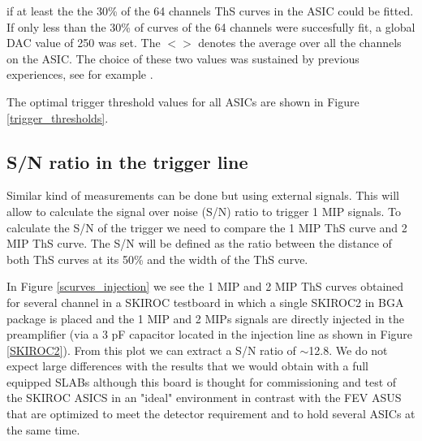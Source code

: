 \documentclass[a4paper,11pt]{article}
\begin{document}
if at least the the 30\% of the 64 channels ThS curves in the ASIC could be fitted.
If only less  than the 30\% of curves of the 64 channels were
succesfully fit, a global DAC value of 250 was set.
The $<>$ denotes the average over all the channels on the ASIC.
The choice of these two values was 
sustained by previous experiences, see for example \cite{Amjad:2014tha}.

The optimal trigger threshold values for all ASICs are shown in Figure \ref{trigger_thresholds}.


\subsection{S/N ratio in the trigger line}
\label{sec:comm_trigger_sn}

Similar kind of measurements can be done but using external signals. 
This will allow to calculate the signal over noise (S/N) ratio to trigger 1 MIP signals.
To calculate the S/N of the trigger we need to compare the 1 MIP ThS curve and 2 MIP ThS curve. The S/N 
will be defined as the ratio between the distance of both ThS curves at its 50\% and the width of the 
ThS curve.

In Figure \ref{scurves_injection} we see the 1 MIP and 2 MIP ThS curves obtained for several channel
in a SKIROC testboard in which a single SKIROC2 in BGA package is placed and the 1 MIP and 2 MIPs 
 signals are directly injected in the preamplifier 
(via a 3 pF capacitor located in the injection line as shown in Figure \ref{SKIROC2}). 
From this plot we can extract a S/N ratio of $\sim$12.8. 
We do not expect large differences with the results that we would obtain with 
a full equipped SLABs 
although this board is thought for commissioning and test of the SKIROC ASICS in an
"ideal" environment in contrast with the FEV
ASUS that are optimized to meet the detector requirement and to hold several ASICs at the same time.
\end{document}
